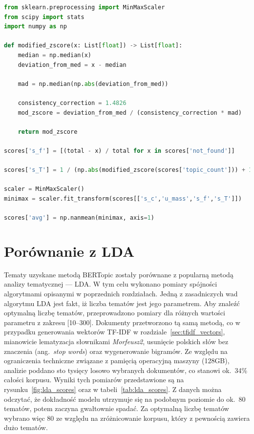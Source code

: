 		\begin{lstlisting}[label=lst:final_score,language=Python,caption=Obliczanie finalnej oceny spójności tematów dla listy modeli]
from sklearn.preprocessing import MinMaxScaler
from scipy import stats
import numpy as np

def modified_zscore(x: List[float]) -> List[float]:
	median = np.median(x)
	deviation_from_med = x - median

	mad = np.median(np.abs(deviation_from_med))

	consistency_correction = 1.4826
	mod_zscore = deviation_from_med / (consistency_correction * mad)

	return mod_zscore

scores['s_f'] = [(total - x) / total for x in scores['not_found']]

scores['s_T'] = 1 / (np.abs(modified_zscore(scores['topic_count'])) + 1)

scaler = MinMaxScaler()
minimax = scaler.fit_transform(scores[['s_c','u_mass','s_f','s_T']])

scores['avg'] = np.nanmean(minimax, axis=1)
		\end{lstlisting}

\section{Porównanie z LDA}
	Tematy uzyskane metodą BERTopic zostały porównane z popularną metodą analizy tematycznej --- LDA\@.
	W tym celu wykonano pomiary spójności algorytmami opisanymi w poprzednich rozdziałach.
	Jedną z zasadniczych wad algorytmu LDA jest fakt, iż liczba tematów jest jego parametrem.
	Aby znaleźć optymalną liczbę tematów, przeprowadzono pomiary dla różnych wartości parametru z zakresu [10--300].
	Dokumenty przetworzono tą samą metodą, co w przypadku generowania wektorów TF-IDF w rozdziale~\ref{sec:tfidf_vectors},
		mianowicie lematyzacja słownikami \emph{Morfeusz2}, usunięcie polskich słów bez znaczenia (ang.\ \emph{stop words}) oraz wygenerowanie bigramów.
	Ze względu na ograniczenia techniczne związane z pamięcią operacyjną maszyny (128GB), analizie poddano sto tysięcy losowo wybranych dokumentów,
		co stanowi ok.~34\% całości korpusu.
	Wyniki tych pomiarów przedstawione są na rysunku~\ref{fig:lda_scores} oraz w tabeli~\ref{tab:lda_scores}.
	Z danych można odczytać, że dokładność modelu utrzymuje się na podobnym poziomie do ok.~80 tematów, potem zaczyna gwałtownie spadać.
	Za optymalną liczbę tematów wybrano więc 80 ze względu na zróżnicowanie korpusu, który z pewnością zawiera dużo tematów.

